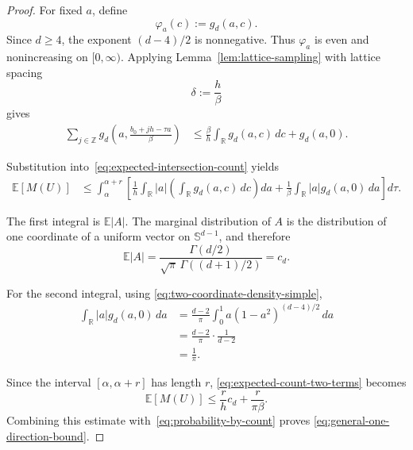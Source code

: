 \begin{proof}
For fixed $a$, define
\[
    \varphi_a(c):=g_d(a,c).
\]
Since $d\geq4$, the exponent $(d-4)/2$ is nonnegative. Thus
$\varphi_a$ is even and nonincreasing on $[0,\infty)$. Applying
Lemma~\ref{lem:lattice-sampling} with lattice spacing
\[
    \delta:=\frac{h}{\beta}
\]
gives
\begin{align}
    \sum_{j\in\mathbb{Z}}
    g_d
    \left(
        a,
        \frac{b_0+jh-\tau a}{\beta}
    \right)
    &\leq
    \frac{\beta}{h}
    \int_{\mathbb{R}}g_d(a,c)\,dc
    +
    g_d(a,0).
    \label{eq:density-lattice-bound}
\end{align}

Substitution into~\eqref{eq:expected-intersection-count} yields
\begin{align}
    \mathbb{E}[M(U)]
    &\leq
    \int_{\alpha}^{\alpha+r}
    \left[
        \frac{1}{h}
        \int_{\mathbb{R}}
        |a|
        \left(
            \int_{\mathbb{R}}g_d(a,c)\,dc
        \right)
        da
        +
        \frac{1}{\beta}
        \int_{\mathbb{R}}
        |a|g_d(a,0)\,da
    \right]
    d\tau.
    \label{eq:expected-count-two-terms}
\end{align}

The first integral is $\mathbb{E}|A|$. The marginal distribution of
$A$ is the distribution of one coordinate of a uniform vector on
$\mathbb{S}^{d-1}$, and therefore
\begin{equation}
    \mathbb{E}|A|
    =
    \frac{\Gamma(d/2)}
         {\sqrt{\pi}\,\Gamma((d+1)/2)}
    =
    c_d.
    \label{eq:absolute-coordinate-expectation}
\end{equation}

For the second integral, using
\eqref{eq:two-coordinate-density-simple},
\begin{align}
    \int_{\mathbb{R}}
    |a|g_d(a,0)\,da
    &=
    \frac{d-2}{\pi}
    \int_0^1
    a(1-a^2)^{(d-4)/2}\,da
    \nonumber\\
    &=
    \frac{d-2}{\pi}
    \cdot
    \frac{1}{d-2}
    \nonumber\\
    &=
    \frac{1}{\pi}.
    \label{eq:second-density-integral}
\end{align}

Since the interval $[\alpha,\alpha+r]$ has length $r$,
\eqref{eq:expected-count-two-terms} becomes
\begin{equation}
    \mathbb{E}[M(U)]
    \leq
    \frac{r}{h}c_d
    +
    \frac{r}{\pi\beta}.
    \label{eq:expected-count-final}
\end{equation}
Combining this estimate with~\eqref{eq:probability-by-count} proves
\eqref{eq:general-one-direction-bound}.
\end{proof}


